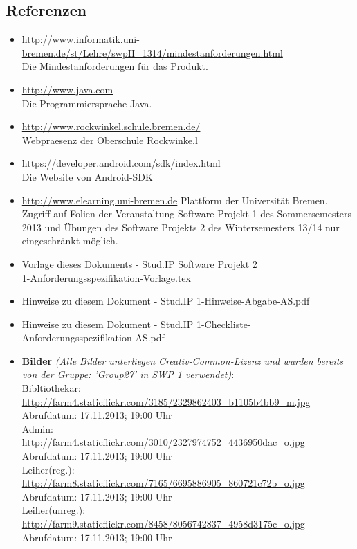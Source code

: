 \documentclass[fontsize=12pt,paper=a4,twoside]{scrartcl}
\begin{document}
\subsection{Referenzen} \label{subsec:Referenzen} 
\begin{itemize}
	\item{\url{http://www.informatik.uni-bremen.de/st/Lehre/swpII_1314/mindestanforderungen.html}\\
	Die Mindestanforderungen für das Produkt.} 
	\item{\url{http://www.java.com}\\
	Die Programmiersprache Java.} 
	\item{\url{http://www.rockwinkel.schule.bremen.de/}\\
	Webpraesenz der Oberschule Rockwinke.l} 
	\item{\url{https://developer.android.com/sdk/index.html}\\
	Die Website von Android-SDK} 
	\item{\url{http://www.elearning.uni-bremen.de} Plattform der Universität Bremen. Zugriff auf Folien der Veranstaltung Software Projekt 1 des Sommersemesters 2013 und Übungen des Software Projekts 2 des Wintersemesters 13/14 nur eingeschränkt möglich.} 
	\item{Vorlage dieses Dokuments - Stud.IP Software Projekt 2\\
	1-Anforderungsspezifikation-Vorlage.tex} 
	\item{Hinweise zu diesem Dokument - Stud.IP 1-Hinweise-Abgabe-AS.pdf} 
	\item{Hinweise zu diesem Dokument - Stud.IP 1-Checkliste-Anforderungsspezifikation-AS.pdf} 
	\item \textbf{Bilder} \textit{(Alle Bilder unterliegen Creativ-Common-Lizenz und wurden bereits von der Gruppe: 'Group27' in SWP 1 verwendet)}:\\
	Bibltiothekar:\\
	\url{http://farm4.staticflickr.com/3185/2329862403_b1105b4bb9_m.jpg}\\
	Abrufdatum: 17.11.2013; 19:00 Uhr\\
	Admin:\\
	\url{http://farm4.staticflickr.com/3010/2327974752_4436950dac_o.jpg}\\
	Abrufdatum: 17.11.2013; 19:00 Uhr\\
	Leiher(reg.):\\
	\url{http://farm8.staticflickr.com/7165/6695886905_860721c72b_o.jpg}\\
	Abrufdatum: 17.11.2013; 19:00 Uhr\\
	Leiher(unreg.):\\
	\url{http://farm9.staticflickr.com/8458/8056742837_4958d3175c_o.jpg}\\
	Abrufdatum: 17.11.2013; 19:00 Uhr\\
\end{itemize}
\end{document}
